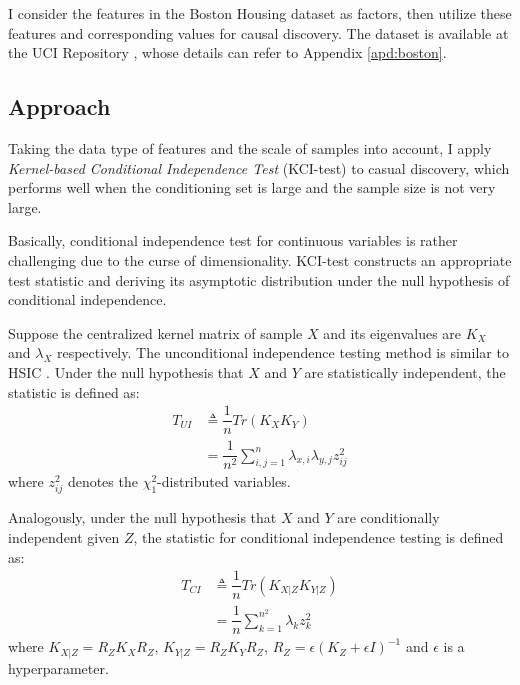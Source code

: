 \documentclass[12pt,a4paper]{article}
\theoremstyle{definition}
\begin{document}
\vspace{0.008\linewidth}
I consider the features in the Boston Housing dataset as factors, then utilize these features and corresponding values for causal discovery. The dataset is available at the UCI Repository \cite{boston}, whose details can refer to Appendix \ref{apd:boston}.

\subsection{Approach}

Taking the data type of features and the scale of samples into account, I apply \textit{Kernel-based Conditional Independence Test} (KCI-test) \cite{alg} to casual discovery, which performs well when the conditioning set is large and the sample size is not very large.

\vspace{0.008\linewidth}
Basically, conditional independence test for continuous variables is rather challenging due to the curse of dimensionality. KCI-test constructs an appropriate test statistic and deriving its asymptotic distribution under the null hypothesis of conditional independence.

\vspace{0.008\linewidth}
Suppose the centralized kernel matrix of sample $X$ and its eigenvalues are $K_X$ and $\lambda_X$ respectively. The unconditional independence testing method is similar to HSIC \cite{HSIC}. Under the null hypothesis that $X$ and $Y$ are statistically independent, the statistic is defined as:
\begin{align*}
	T_{UI} & \triangleq \dfrac{1}{n}Tr(K_{X}K_{Y}) \\
	& = \dfrac{1}{n^2}\sum_{i,j=1}^{n}\lambda_{x,i}\lambda_{y,j}z^2_{ij}
\end{align*}
where $z^2_{ij}$ denotes the $\chi^2_1$-distributed variables.

\vspace{0.008\linewidth}
Analogously, under the null hypothesis that $X$ and $Y$ are conditionally independent given $Z$, the statistic for conditional independence testing is defined as:
\begin{align*}
	T_{CI} & \triangleq \dfrac{1}{n}Tr(K_{X|Z}K_{Y|Z}) \\
	& = \dfrac{1}{n}\sum_{k=1}^{n^2}\lambda_{k}z^2_{k}
\end{align*}
where $K_{X|Z}=R_ZK_XR_Z$, $K_{Y|Z}=R_ZK_YR_Z$, $R_Z=\epsilon(K_Z+\epsilon I)^{-1}$ and $\epsilon$ is a hyperparameter.
\end{document}
